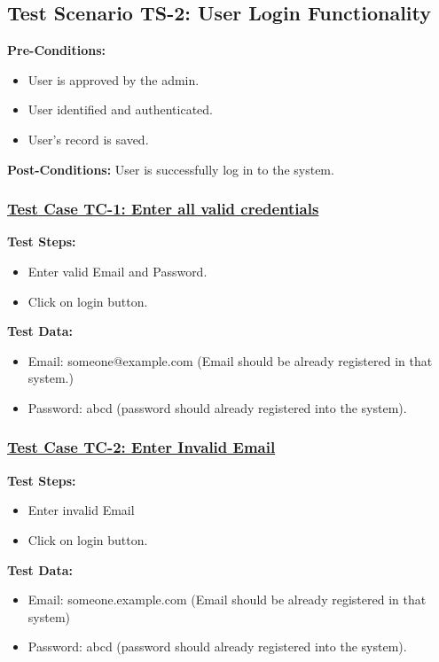 \subsection{Test Scenario TS-2: User Login Functionality}
\textbf{Pre-Conditions: } 
\begin{itemize}

\item User is approved by the admin.
\item User identified and authenticated.
\item User's record is saved.

\end{itemize}

\textbf{Post-Conditions: } User is successfully log in to the system.
\subsubsection{\underline{Test Case TC-1: Enter all valid credentials}}
\textbf{Test Steps:}
\begin{itemize}

\item Enter valid Email and Password.
\item Click on login button.

\end{itemize}

\textbf{Test Data:}
\begin{itemize}

\item Email: someone@example.com (Email should be already registered in that system.)
\item Password: abcd (password should already registered into the system).

\end{itemize}

\subsubsection{\underline{Test Case TC-2: Enter Invalid Email}}
\textbf{Test Steps:}
\begin{itemize}

\item Enter invalid Email
\item Click on login button.

\end{itemize}

\textbf{Test Data:}
\begin{itemize}

\item Email: someone.example.com (Email should be already registered in that system)
\item Password: abcd (password should already registered into the system).

\end{itemize}

